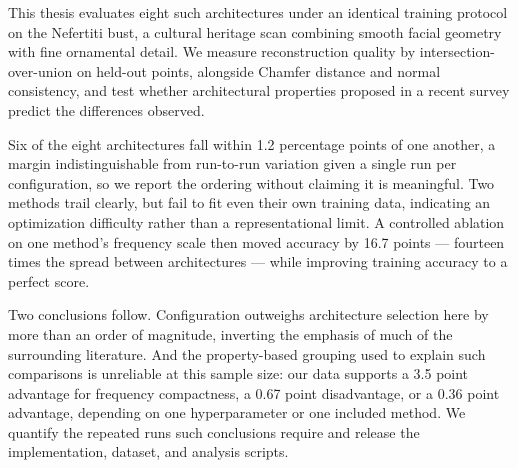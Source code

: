 This thesis evaluates eight such architectures under an identical training protocol on the Nefertiti bust, a cultural heritage scan combining smooth facial geometry with fine ornamental detail. We measure reconstruction quality by intersection-over-union on held-out points, alongside Chamfer distance and normal consistency, and test whether architectural properties proposed in a recent survey predict the differences observed.

Six of the eight architectures fall within 1.2 percentage points of one another, a margin indistinguishable from run-to-run variation given a single run per configuration, so we report the ordering without claiming it is meaningful. Two methods trail clearly, but fail to fit even their own training data, indicating an optimization difficulty rather than a representational limit. A controlled ablation on one method's frequency scale then moved accuracy by 16.7 points --- fourteen times the spread between architectures --- while improving training accuracy to a perfect score.

Two conclusions follow. Configuration outweighs architecture selection here by more than an order of magnitude, inverting the emphasis of much of the surrounding literature. And the property-based grouping used to explain such comparisons is unreliable at this sample size: our data supports a 3.5 point advantage for frequency compactness, a 0.67 point disadvantage, or a 0.36 point advantage, depending on one hyperparameter or one included method. We quantify the repeated runs such conclusions require and release the implementation, dataset, and analysis scripts.
